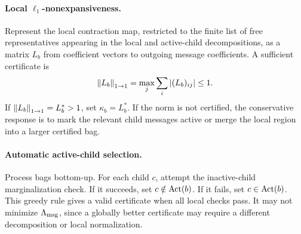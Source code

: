 \paragraph{Local \(\ell_1\)-nonexpansiveness.}
Represent the local contraction map, restricted to the finite list of free representatives appearing in the local and active-child decompositions, as a matrix \(L_b\) from coefficient vectors to outgoing message coefficients. A sufficient certificate is
\[
\left\lVert L_b \right\rVert_{1\to 1}=\max_j\sum_i |(L_b)_{ij}|\le 1.
\]
If \(\left\lVert L_b \right\rVert_{1\to 1}=L_b^\ast>1\), set \(\kappa_b=L_b^\ast\). If the norm is not certified, the conservative response is to mark the relevant child messages active or merge the local region into a larger certified bag.

\paragraph{Automatic active-child selection.}
Process bags bottom-up. For each child \(c\), attempt the inactive-child marginalization check. If it succeeds, set \(c\notin\operatorname{Act}(b)\). If it fails, set \(c\in\operatorname{Act}(b)\). This greedy rule gives a valid certificate when all local checks pass. It may not minimize \(\Lambda_{\mathrm{msg}}\), since a globally better certificate may require a different decomposition or local normalization.

\begin{center}
\end{center}

